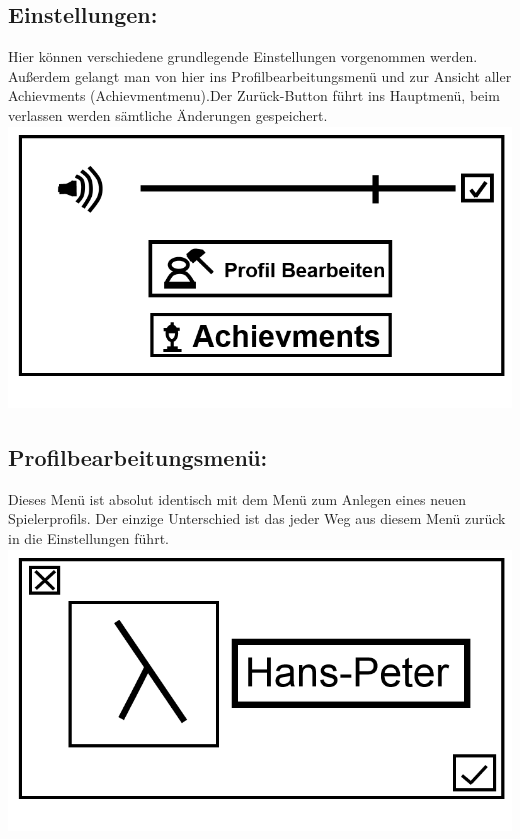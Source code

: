 \documentclass{scrartcl}
\begin{document}
\begin{enumerate}
	\begin{minipage}{1\textwidth}
		\item \subsection*{Einstellungen:}
		Hier können verschiedene grundlegende Einstellungen vorgenommen werden. Außerdem gelangt man von hier ins Profilbearbeitungsmenü und zur Ansicht aller Achievments (Achievmentmenu).Der Zurück-Button führt ins Hauptmenü, beim verlassen werden sämtliche Änderungen gespeichert.\\
		\includegraphics[width=\textwidth, height=7.5cm]{assets/Einstellungen}
	\end{minipage}

	\begin{minipage}{1\textwidth}
		\item \subsection*{Profilbearbeitungsmenü:}
		Dieses Menü ist absolut identisch mit dem Menü zum Anlegen eines neuen Spielerprofils. Der einzige Unterschied ist das jeder Weg aus diesem Menü zurück in die Einstellungen führt.\\
		\includegraphics[width=\textwidth, height=7.5cm]{assets/CreateProfile}
	\end{minipage}


\end{enumerate}
\end{document}
